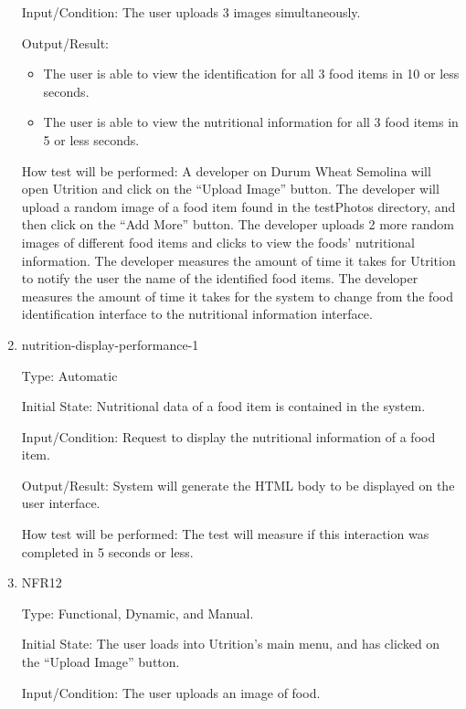 \documentclass[12pt, titlepage]{article}
\begin{document}
\begin{enumerate}
		Input/Condition: The user uploads 3 images simultaneously.
		
		Output/Result: 
		\begin{itemize}
			\item The user is able to view the identification for all 3 food items in 10 or less seconds.
			\item The user is able to view the nutritional information for all 3 food items in 5 or less seconds.
		\end{itemize}
		
		How test will be performed: A developer on Durum Wheat Semolina will 
		open Utrition and click on the “Upload Image” button. The developer 
		will upload a random image of a food item found in the testPhotos 
		directory, and then click on the “Add More” button. The developer 
		uploads 2 more random images of different food items and clicks to view 
		the foods’ nutritional information. The developer measures the amount 
		of time it takes for Utrition to notify the user the name of the 
		identified food items. The developer measures the amount of time it 
		takes for the system to change from the food identification interface 
		to the nutritional information interface.
		
		\item{nutrition-display-performance-1\\}
		
		Type: Automatic
		
		Initial State: Nutritional data of a food item is contained in the 
		system.
		
		Input/Condition: Request to display the nutritional information of a 
		food item.
		
		Output/Result: System will generate the HTML body to be displayed on 
		the user 
		interface.
		
		How test will be performed: The test will measure if this interaction 
		was completed in 5 seconds or less.
		
		\item{NFR12\\} 
		
		Type: Functional, Dynamic, and Manual.
		
		Initial State: The user loads into Utrition’s main menu, and has clicked on the “Upload Image” 
		button.
		
		Input/Condition: The user uploads an image of food.
		

\end{enumerate}
\end{document}
